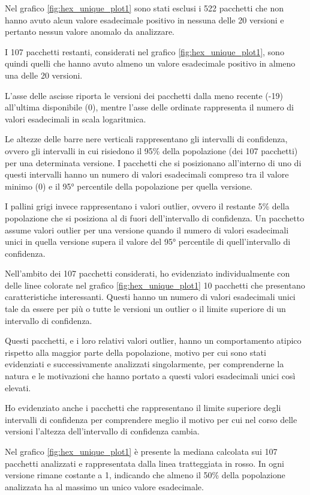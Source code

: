 Nel grafico \ref{fig:hex_unique_plot1} sono stati esclusi 
i 522 pacchetti che non hanno avuto alcun valore esadecimale positivo in nessuna delle 20 versioni
e pertanto nessun valore anomalo da analizzare.

I 107 pacchetti restanti, considerati nel grafico \ref{fig:hex_unique_plot1}, sono quindi 
quelli che hanno avuto almeno un valore esadecimale positivo in almeno una delle 20 versioni.

L'asse delle ascisse riporta le versioni dei pacchetti dalla meno recente (-19) all'ultima disponibile (0), mentre 
l'asse delle ordinate rappresenta il numero di valori esadecimali in scala logaritmica.

Le altezze delle barre nere verticali rappresentano gli intervalli di confidenza, 
ovvero gli intervalli in cui risiedono il 95\% della popolazione (dei 107 pacchetti) per una determinata versione.
I pacchetti che si posizionano all'interno di uno di questi intervalli
hanno un numero di valori esadecimali compreso 
tra il valore minimo (0) e il 95° percentile della popolazione per quella versione.

I pallini grigi invece rappresentano i valori outlier,
ovvero il restante 5\% della popolazione che si posiziona al di fuori dell'intervallo di confidenza.
Un pacchetto assume valori outlier per una versione quando il numero di valori esadecimali unici in quella versione supera il valore del 95° percentile
di quell'intervallo di confidenza.


Nell'ambito dei 107 pacchetti considerati, 
ho evidenziato individualmente con 
delle linee colorate nel grafico \ref{fig:hex_unique_plot1}
10 pacchetti che presentano caratteristiche interessanti.
Questi hanno un numero di valori esadecimali unici tale da 
essere per più o tutte le versioni un outlier o il limite superiore di un intervallo di confidenza.


Questi pacchetti, e i loro relativi valori outlier, hanno 
un comportamento atipico rispetto alla maggior parte della popolazione,
motivo per cui sono stati evidenziati e successivamente analizzati singolarmente,
per comprenderne la natura e le motivazioni che hanno portato a questi valori esadecimali unici così elevati.


Ho evidenziato anche i pacchetti che rappresentano il limite superiore degli intervalli di confidenza 
per comprendere meglio il motivo per cui nel corso delle versioni l'altezza dell'intervallo di confidenza cambia.


Nel grafico \ref{fig:hex_unique_plot1} è presente la mediana
calcolata sui 107 pacchetti analizzati e rappresentata dalla linea tratteggiata in rosso. 
In ogni versione rimane costante a 1, indicando che almeno il 50\% della popolazione analizzata ha al massimo un unico valore esadecimale.

